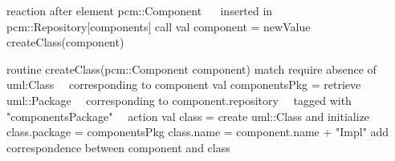 reaction {
   after element pcm::Component ~\label{lst:line:trigger}~
           inserted in pcm::Repository[components]
   call {
      val component = newValue
      createClass(component)
   }
}

routine createClass(pcm::Component component) {
   match {
      require absence of uml:Class~\label{lst:line:absence}~
         corresponding to component
      val componentsPkg = retrieve uml::Package~\label{lst:line:retrievestatement}~
         corresponding to component.repository~\label{lst:line:retrievetype}~
         tagged with "componentsPackage"~\label{lst:line:retrievetag}~
   }
   action {
      val class = create uml::Class and initialize {~\label{lst:line:createassignment}~
         class.package = componentsPkg
         class.name = component.name + "Impl"
      }
      add correspondence between component and class~\label{lst:line:createcorrespondence}~
   }
}